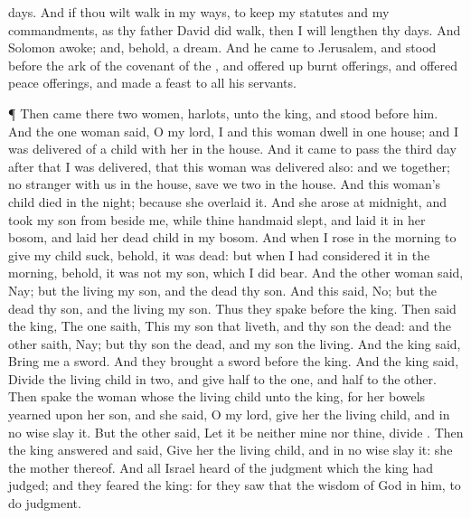 {days.
And if thou wilt
walk in my
ways, to
keep my
statutes and my
commandments, as thy
father
David did
walk, then I will
lengthen thy
days.
And
Solomon
awoke; and, behold,
{} a
dream. And he
came to
Jerusalem, and
stood
before the
ark of the
covenant of the
{}, and offered
up burnt
offerings, and
offered peace
offerings, and
made a
feast to all his
servants.
\par }{\PP {}¶ Then
came there
two
women,
{}
harlots, unto the
king, and
stood
before him.
And the
one
woman
said,
O my
lord, I and this
woman
dwell in
one
house; and I was delivered of a
child with her in the
house.
And it came to pass the
third
day after that I was
delivered, that this
woman was
delivered also: and we
{}
together;
{} no
stranger with us in the
house,
save we
two in the
house.
And this
woman’s
child
died in the
night; because she
overlaid it.
And she
arose at
midnight, and
took my
son from
beside me, while thine
handmaid
slept, and
laid it in her
bosom, and
laid her
dead
child in my
bosom.
And when I
rose in the
morning to give my
child
suck, behold, it was
dead: but when I had
considered it in the
morning, behold, it was not my
son, which I did
bear.
And the
other
woman
said, Nay; but the
living
{} my
son, and the
dead
{} thy
son. And this
said, No; but the
dead
{} thy
son, and the
living
{} my
son. Thus they
spake
before the
king.
Then
said the
king, The
one
saith, This
{} my
son that
liveth, and thy
son
{} the
dead: and the
other
saith, Nay; but thy
son
{} the
dead, and my
son
{} the
living.
And the
king
said,
Bring me a
sword. And they
brought a
sword
before the
king.
And the
king
said,
Divide the
living
child in
two, and
give
half to the
one, and
half to the
other.
Then
spake the
woman whose the
living
child
{} unto the
king, for her
bowels
yearned upon her
son, and she
said,
O my
lord,
give her the
living
child, and in no
wise
slay it. But the other
said, Let it be neither mine nor thine,
{}
divide
{}.
Then the
king
answered and
said,
Give her the
living
child, and in no
wise
slay it: she
{} the
mother thereof.
And all
Israel
heard of the
judgment which the
king had
judged; and they
feared the
king: for they
saw that the
wisdom of
God
{} in
him, to
do
judgment.

}
